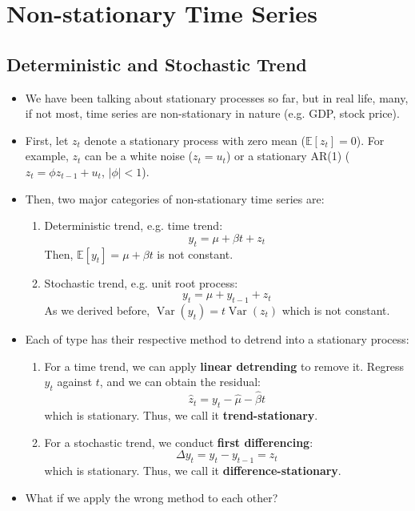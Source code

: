 \documentclass[notitlepage]{article}
\DeclareMathOperator{\Var}{Var}
\begin{document}
\section{Non-stationary Time Series}

\subsection{Deterministic and Stochastic Trend}

\begin{itemize}
    \item We have been talking about stationary processes so far, but in real life, many, if not most, time series are non-stationary in nature (e.g. GDP, stock price).
    \item First, let \(z_t\) denote a stationary process with zero mean (\(\mathbb{E}[z_t] = 0\)). For example, \(z_t\) can be a white noise (\(z_t=u_t\)) or a stationary AR(1) (\(z_t=\phi z_{t-1} + u_t\), \(|\phi| < 1\)).
    \item Then, two major categories of non-stationary time series are:
    \begin{enumerate}
        \item Deterministic trend, e.g. time trend:
        \[
        y_t = \mu + \beta t + z_t
        \]
        Then, \(\mathbb{E}[y_t] = \mu + \beta t\) is not constant.
        \item Stochastic trend, e.g. unit root process:
        \[
        y_t = \mu + y_{t-1} + z_t
        \]
        As we derived before, \(\Var(y_t) = t \Var(z_t)\) which is not constant.
    \end{enumerate}
    \item Each of type has their respective method to detrend into a stationary process:
    \begin{enumerate}
        \item For a time trend, we can apply \textbf{linear detrending} to remove it. Regress \(y_t\) against \(t\), and we can obtain the residual:
        \[
        \hat{z}_t = y_t - \hat{\mu} - \hat{\beta}t
        \]
        which is stationary. Thus, we call it \textbf{trend-stationary}.
        \item For a stochastic trend, we conduct \textbf{first differencing}:
        \[
        \Delta y_t = y_t - y_{t-1} = z_t
        \]
        which is stationary. Thus, we call it \textbf{difference-stationary}.
    \end{enumerate}
    \item What if we apply the wrong method to each other?

\end{itemize}
\end{document}
